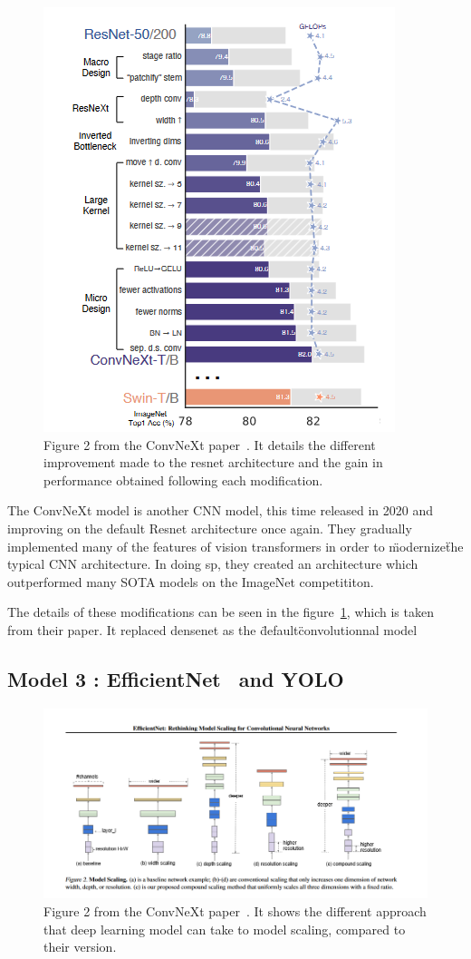 \documentclass[11pt]{article}
\begin{document}
\begin{figure}[H]

     \centering
     \includegraphics[width=0.5 \textwidth]{plots/convnext_graph}
     \caption{Figure 2 from the ConvNeXt paper~\cite{convnext}. It details the different improvement made to the
     resnet architecture and the gain in performance obtained following each modification.}
     \label{fig:convnext}

\end{figure}

        The ConvNeXt model is another CNN model, this time released in 2020 and improving on the default Resnet architecture once again.
        They gradually implemented many of the features of vision transformers in order to \"modernize\" the typical
    CNN architecture. In doing sp,
        they created an architecture which outperformed many SOTA models on the ImageNet competititon.

        The details of these modifications can be seen in the figure~\ref{fig:convnext}, which is taken from their paper.
        It replaced densenet as the \"default\" convolutionnal model


    \subsection{Model 3 : EfficientNet~\cite{efficientnet} and YOLO~\cite{yolo}}


\begin{figure}[H]

     \centering
     \includegraphics[width=0.8 \textwidth]{plots/efficientnet}
     \caption{Figure 2 from the ConvNeXt paper~\cite{efficientnet}. It shows the different approach that deep learning
     model can take to model scaling, compared to their version.}
     \label{fig:efficientnet}

\end{figure}
\end{document}
